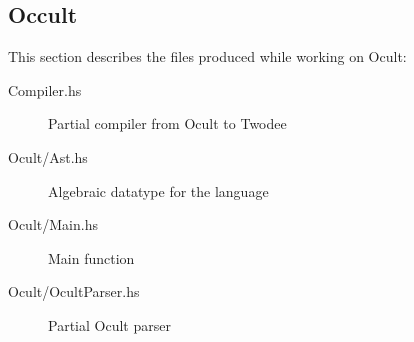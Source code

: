 \subsection{Occult}
This section describes the files produced while working on Ocult:
\begin{description}
\item[Compiler.hs]   Partial compiler from Ocult to Twodee
\item[Ocult/Ast.hs]  Algebraic datatype for the language
\item[Ocult/Main.hs] Main function
\item[Ocult/OcultParser.hs] Partial Ocult parser
\end{description}




